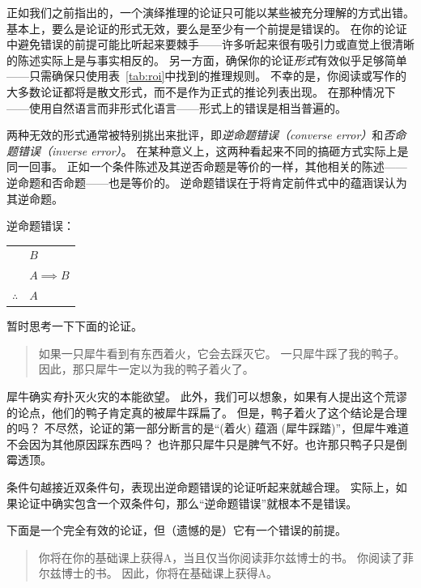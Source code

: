 正如我们之前指出的，一个演绎推理的论证只可能以某些被充分理解的方式出错。
基本上，要么是论证的形式无效，要么是至少有一个前提是错误的。
在你的论证中避免错误的前提可能比听起来要棘手——许多听起来很有吸引力或直觉上很清晰的陈述实际上是与事实相反的。
另一方面，确保你的论证\emph{形式}有效似乎足够简单——只需确保只使用表~\ref{tab:roi}中找到的推理规则。
不幸的是，你阅读或写作的大多数论证都将是散文形式，而不是作为正式的推论列表出现。
在那种情况下——使用自然语言而非形式化语言——形式上的错误是相当普遍的。

两种无效的形式通常被特别挑出来批评，即\emph{逆命题错误（converse error）}和\emph{否命题错误（inverse error）}。
在某种意义上，这两种看起来不同的搞砸方式实际上是同一回事。
正如一个条件陈述及其逆否命题是等价的一样，其他相关的陈述——逆命题和否命题——也是等价的。
逆命题错误在于将肯定前件式中的蕴涵误认为其逆命题。

逆命题错误：

\begin{center}
\begin{tabular}{cl}
 & $B$ \\
 & $A \implies B$ \\ \hline
$\therefore$ & $A$ \\
\end{tabular}
\end{center}

暂时思考一下下面的论证。
\begin{quote}
如果一只犀牛看到有东西着火，它会去踩灭它。\newline
一只犀牛踩了我的鸭子。\newline
因此，那只犀牛一定以为我的鸭子着火了。
\end{quote} 

犀牛确实\emph{有}扑灭火灾的本能欲望。
此外，我们可以想象，如果有人提出这个荒谬的论点，他们的鸭子肯定真的被犀牛踩扁了。
但是，鸭子着火了这个结论是合理的吗？
不尽然，论证的第一部分断言的是“(着火) 蕴涵 (犀牛踩踏)”，但犀牛难道不会因为其他原因踩东西吗？
也许那只犀牛只是脾气不好。也许那只鸭子只是倒霉透顶。

条件句越接近双条件句，表现出逆命题错误的论证听起来就越合理。
实际上，如果论证中确实包含一个双条件句，那么“逆命题错误”就根本不是错误。

下面是一个完全有效的论证，但（遗憾的是）它有一个错误的前提。
\begin{quote}

你将在你的基础课上获得A，当且仅当你阅读菲尔兹博士的书。\newline
你阅读了菲尔兹博士的书。\newline
因此，你将在基础课上获得A。
\end{quote}

